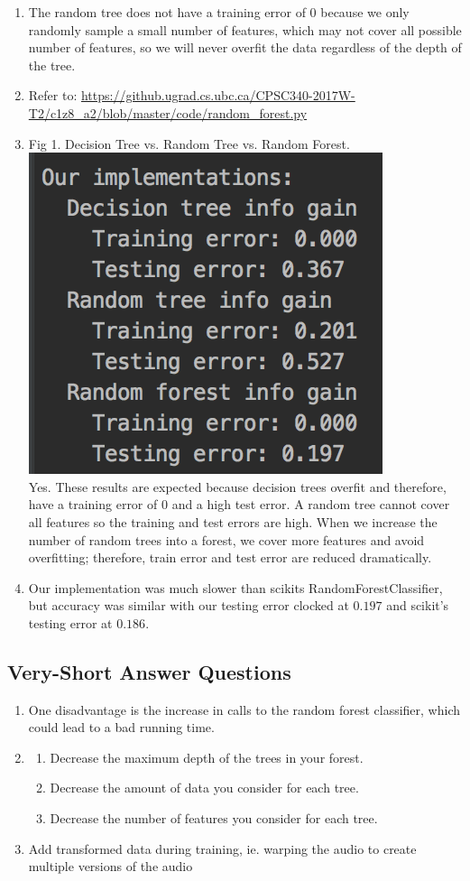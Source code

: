 \documentclass{article}
\def\enum#1{\begin{enumerate}#1\end{enumerate}}
\begin{document}
\enum{
\item The random tree does not have a training error of 0 because we only randomly sample a small number of features, which may not cover all possible number of features, so we will never overfit the data regardless of the depth of the tree. 
\item Refer to: \url{https://github.ugrad.cs.ubc.ca/CPSC340-2017W-T2/c1z8_a2/blob/master/code/random_forest.py}
\item Fig 1. Decision Tree vs. Random Tree vs. Random Forest. \\ \hspace{45mm} \includegraphics[scale=0.5]{../figs/forest_example.png} \\ 
Yes. These results are expected because decision trees overfit and therefore, have a training error of 0 and a high test error. A random tree cannot cover all features so the training and test errors are high. When we increase the number of random trees into a forest, we cover more features and avoid overfitting; therefore, train error and test error are reduced dramatically.  
\item Our implementation was much slower than scikits RandomForestClassifier, but accuracy was similar with our testing error clocked at $0.197$ and scikit's testing error at $0.186$. 
}


\subsection{Very-Short Answer Questions}

\enum{
\item One disadvantage is the increase in calls to the random forest classifier, which could lead to a bad running time.
\item 
\enum{
\item Decrease the maximum depth of the trees in your forest.
\item Decrease the amount of data you consider for each tree. 
\item Decrease the number of features you consider for each tree.
}
\item Add transformed data during training, ie. warping the audio to create multiple versions of the audio
}
\end{document}
